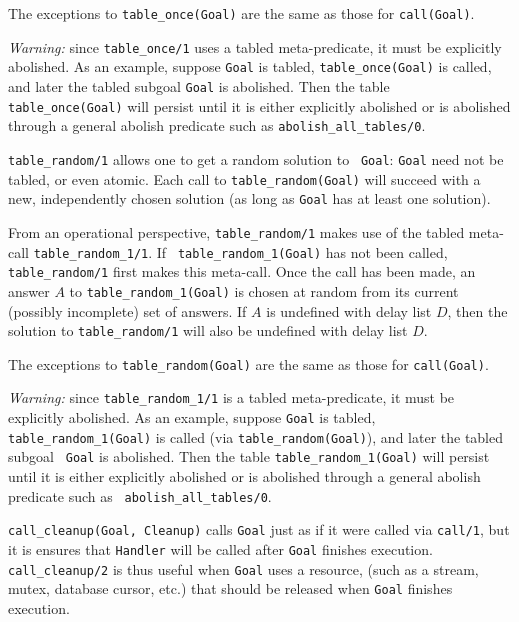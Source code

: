 \begin{description}
\begin{itemize}
The exceptions to {\tt table\_once(Goal)} are the same as those for
{\tt call(Goal)}.

{\em Warning:} since {\tt table\_once/1} uses a tabled meta-predicate,
it must be explicitly abolished.  As an example, suppose {\tt Goal} is
tabled, {\tt table\_once(Goal)} is called, and later the tabled
subgoal {\tt Goal} is abolished.  Then the table {\tt
  table\_once(Goal)} will persist until it is either explicitly
abolished or is abolished through a general abolish predicate such as
{\tt abolish\_all\_tables/0}.

%
{\tt  table\_random/1} allows  one to  get a  random solution  to {\tt
  Goal}: {\tt Goal} need not be  tabled, or even atomic.  Each call to
{\tt  table\_random(Goal)}  will  succeed  with a  new,  independently
chosen solution (as long as {\tt Goal} has at least one solution).

From an operational perspective, {\tt table\_random/1} makes use of
the tabled meta-call {\tt table\_random\_1/1}.  If {\tt
  table\_random\_1(Goal)} has not been called, {\tt table\_random/1}
first makes this meta-call.  Once the call has been made, an answer
$A$ to {\tt table\_random\_1(Goal)} is chosen at random from its
current (possibly incomplete) set of answers.  If $A$ is undefined
with delay list $D$, then the solution to {\tt table\_random/1} will
also be undefined with delay list $D$.

The exceptions to {\tt table\_random(Goal)} are the same as those for
{\tt call(Goal)}.

{\em Warning:} since {\tt table\_random\_1/1} is a tabled
meta-predicate, it must be explicitly abolished.  As an example,
suppose {\tt Goal} is tabled, {\tt table\_random\_1(Goal)} is called
(via {\tt table\_random(Goal)}), and later the tabled subgoal {\tt
  Goal} is abolished.  Then the table {\tt table\_random\_1(Goal)} will
persist until it is either explicitly abolished or is abolished
through a general abolish predicate such as {\tt
  abolish\_all\_tables/0}.

%
{\tt call\_cleanup(Goal, Cleanup)} calls {\tt Goal} just as if it were
called via {\tt call/1}, but it is ensures that {\tt Handler} will be
called after {\tt Goal} finishes execution.  {\tt call\_cleanup/2} is
thus useful when {\tt Goal} uses a resource, (such as a stream, mutex,
database cursor, etc.) that should be released when {\tt Goal}
finishes execution.


\end{itemize}
\end{description}
